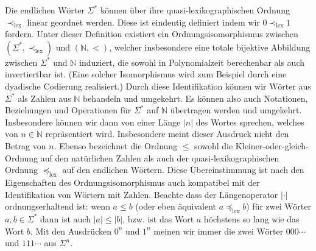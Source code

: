 Die endlichen Wörter $\Sigma^*$ können über ihre quasi-lexikographischen Ordnung $\prec_\mathrm{lex}$ linear geordnet werden. Diese ist eindeutig definiert indem wir $0\prec_\mathrm{lex} 1$ fordern. Unter dieser Definition existiert ein Ordnungsisomorphismus zwischen $(\Sigma^*,\prec_\mathrm{lex})$ und $(\mathbb N, <)$, welcher insbesondere eine totale bijektive Abbildung zwischen $\Sigma^*$ und $\mathbb N$ induziert, die sowohl in Polynomialzeit berechenbar als auch invertiertbar ist. (Eine solcher Isomorphismus wird zum Beispiel durch eine dyadische Codierung realisiert.) Durch diese Identifikation können wir Wörter aus $\Sigma^*$ als Zahlen aus $\mathbb N$ behandeln und umgekehrt. Es können also auch Notationen, Beziehungen und Operationen für $\Sigma^*$ auf $\mathbb N$ übertragen werden und umgekehrt. Insbesondere können wir dann von einer Länge $|n|$ des Wortes sprechen, welches von $n\in\mathbb N$ repräsentiert wird. Insbesondere meint dieser Ausdruck nicht den Betrag von $n$. Ebenso bezeichnet die Ordnung $\leq$ sowohl die Kleiner-oder-gleich-Ordnung auf den natürlichen Zahlen als auch der quasi-lexikographischen Ordnung $\preceq_\mathrm{lex}$ auf den endlichen Wörtern. Diese Übereinstimmung ist nach den Eigenschaften des Ordnungsisomorphismus auch kompatibel mit der Identifikation von Wörtern mit Zahlen. 
Beachte dass der Längenoperator $|\cdot|$ ordnungserhaltend ist: wenn $a\leq b$ (oder eben äquivalent $a\preceq_\mathrm{lex}b$) für zwei Wörter $a,b\in\Sigma^*$ dann ist auch $|a|\leq |b|$, bzw. ist das Wort $a$ höchstens so lang wie das Wort $b$.
Mit den Ausdrücken $0^n$ und $1^n$ meinen wir immer die zwei Wörter $000\cdots$ und $111\cdots$ aus $\Sigma^n$.

